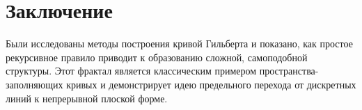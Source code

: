 \section*{Заключение}

Были исследованы методы построения кривой Гильберта и показано, как простое рекурсивное правило приводит к образованию сложной, самоподобной структуры. Этот фрактал является классическим примером пространства-заполняющих кривых и демонстрирует идею предельного перехода от дискретных линий к непрерывной плоской форме.